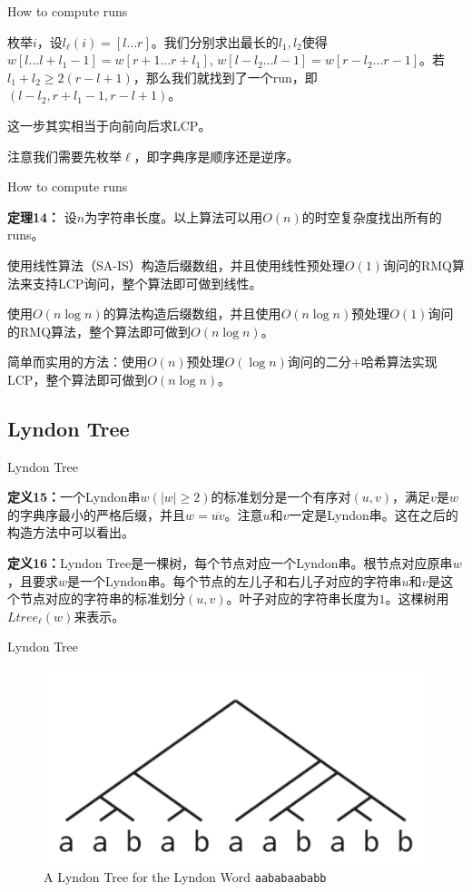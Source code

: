 \documentclass{beamer}
\begin{document}
\begin{frame}{How to compute runs}
	\par 枚举$i$，设$l_{\ell}(i)=[l...r]$。我们分别求出最长的$l_1, l_2$使得$w[l...l+l_1-1]=w[r+1...r+l_1]$, $w[l-l_2...l-1]=w[r-l_2...r-1]$。若$l_1+l_2 \ge 2(r-l+1)$，那么我们就找到了一个run，即$(l-l_2, r+l_1-1, r-l+1)$。
	\pause
	\par 这一步其实相当于向前向后求LCP。
	\pause
	\par 注意我们需要先枚举$\ell$，即字典序是顺序还是逆序。
\end{frame}

\begin{frame}{How to compute runs}
	\par \textbf{定理14：} 设$n$为字符串长度。以上算法可以用$O(n)$的时空复杂度找出所有的runs。
	\pause
	\par 使用线性算法（SA-IS）构造后缀数组，并且使用线性预处理$O(1)$询问的RMQ算法来支持LCP询问，整个算法即可做到线性。
	\pause
	\par 使用$O(n \log n)$的算法构造后缀数组，并且使用$O(n \log n)$预处理$O(1)$询问的RMQ算法，整个算法即可做到$O(n \log n)$。
	\pause
	\par	简单而实用的方法：使用$O(n)$预处理$O(\log n)$询问的二分+哈希算法实现LCP，整个算法即可做到$O(n \log n)$。
	\pause
\end{frame}

\subsection{Lyndon Tree}
\begin{frame}{Lyndon Tree}
	\par \textbf{定义15：}一个Lyndon串$w (|w| \ge 2)$的标准划分是一个有序对$(u, v)$，满足$v$是$w$的字典序最小的严格后缀，并且$w = \overline{uv}$。注意$u$和$v$一定是Lyndon串。这在之后的构造方法中可以看出。
	\pause
	\par \textbf{定义16：}Lyndon Tree是一棵树，每个节点对应一个Lyndon串。根节点对应原串$w$，且要求$w$是一个Lyndon串。每个节点的左儿子和右儿子对应的字符串$u$和$v$是这个节点对应的字符串的标准划分$(u, v)$。叶子对应的字符串长度为$1$。这棵树用$Ltree_{\ell}(w)$来表示。
\end{frame}

\begin{frame}{Lyndon Tree}
\begin{figure}[h]%
	\centering 
	\includegraphics[width=0.7\linewidth]{figures/example.png}
	\caption{A Lyndon Tree for the Lyndon Word \texttt{aababaababb}}
	\label{fig:example}
\end{figure}
\end{frame}
\end{document}
